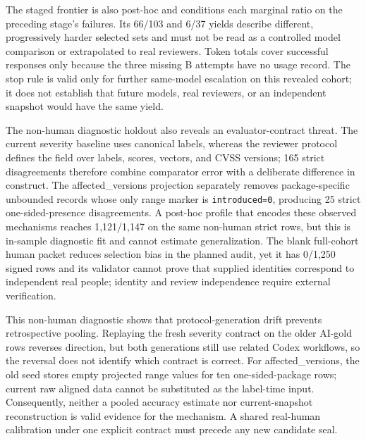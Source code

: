 The staged frontier is also post-hoc and conditions each marginal ratio on the preceding stage's failures. Its 66/103 and 6/37 yields describe different, progressively harder selected sets and must not be read as a controlled model comparison or extrapolated to real reviewers. Token totals cover successful responses only because the three missing B attempts have no usage record. The stop rule is valid only for further same-model escalation on this revealed cohort; it does not establish that future models, real reviewers, or an independent snapshot would have the same yield.

The non-human diagnostic holdout also reveals an evaluator-contract threat. The current severity baseline uses canonical labels, whereas the reviewer protocol defines the field over labels, scores, vectors, and CVSS versions; 165 strict disagreements therefore combine comparator error with a deliberate difference in construct. The affected\_versions projection separately removes package-specific unbounded records whose only range marker is \texttt{introduced=0}, producing 25 strict one-sided-presence disagreements. A post-hoc profile that encodes these observed mechanisms reaches 1,121/1,147 on the same non-human strict rows, but this is in-sample diagnostic fit and cannot estimate generalization. The blank full-cohort human packet reduces selection bias in the planned audit, yet it has 0/1,250 signed rows and its validator cannot prove that supplied identities correspond to independent real people; identity and review independence require external verification.

This non-human diagnostic shows that protocol-generation drift prevents retrospective pooling. Replaying the fresh severity contract on the older AI-gold rows reverses direction, but both generations still use related Codex workflows, so the reversal does not identify which contract is correct. For affected\_versions, the old seed stores empty projected range values for ten one-sided-package rows; current raw aligned data cannot be substituted as the label-time input. Consequently, neither a pooled accuracy estimate nor current-snapshot reconstruction is valid evidence for the mechanism. A shared real-human calibration under one explicit contract must precede any new candidate seal.

